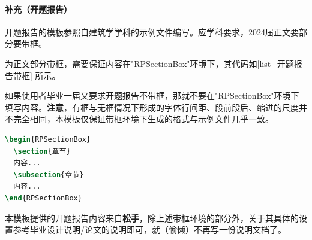 \documentclass[AutoFakeBold]{ZafuThesis}
\begin{document}
\paragraph{补充（开题报告）}
开题报告的模板参照自建筑学学科的示例文件编写。应学科要求，2024届正文要部分要带框。\par
为正文部分带框，需要保证内容在"RPSectionBox"环境下，其代码如\ref{list_开题报告带框} 所示。\par
如果使用者毕业一届又要求开题报告不带框，那就不要在"RPSectionBox"环境下填写内容。\textbf{注意}，有框与无框情况下形成的字体行间距、段前段后、缩进的尺度并不完全相同，本模板仅保证带框环境下生成的格式与示例文件几乎一致。
\begin{lstlisting}[caption=开题报告带框, label = list_开题报告带框,language = tex]
\begin{RPSectionBox}
  \section{章节}
  内容...
  \subsection{章节}
  内容...
\end{RPSectionBox}
\end{lstlisting}\par
本模板提供的开题报告内容来自\textbf{松手}，除上述带框环境的部分外，关于其具体的设置参考毕业设计说明/论文的说明即可，就（偷懒）不再写一份说明文档了。
\end{document}
